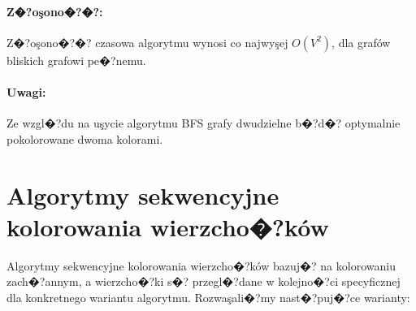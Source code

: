 \documentclass[12pt,a4paper]{mwrep}
\begin{document}
\paragraph{Z�?oşono�?�?:} Z�?oşono�?�? czasowa algorytmu wynosi 
co najwyşej $O(V^2)$, dla grafów bliskich grafowi pe�?nemu.

\paragraph{Uwagi:} Ze wzgl�?du na uşycie algorytmu BFS grafy dwudzielne
b�?d�? optymalnie pokolorowane dwoma kolorami.



\section{Algorytmy sekwencyjne kolorowania wierzcho�?ków}
\label{sec:sequential_algorithms}

Algorytmy sekwencyjne kolorowania wierzcho�?ków bazuj�? na kolorowaniu 
zach�?annym, a wierzcho�?ki s�? przegl�?dane w kolejno�?ci specyficznej
dla konkretnego wariantu algorytmu.
Rozwaşali�?my nast�?puj�?ce warianty:
\end{document}
